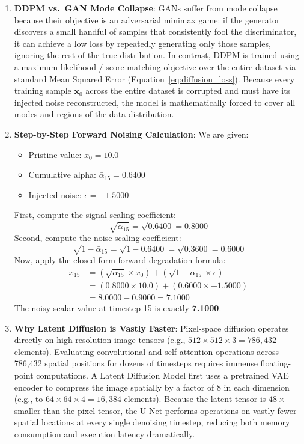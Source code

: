 \begin{enumerate}
    \item \textbf{DDPM vs.\ GAN Mode Collapse}:
    GANs suffer from mode collapse because their objective is an adversarial minimax game: if the generator discovers a small handful of samples that consistently fool the discriminator, it can achieve a low loss by repeatedly generating only those samples, ignoring the rest of the true distribution. In contrast, DDPM is trained using a maximum likelihood / score-matching objective over the entire dataset via standard Mean Squared Error (Equation~\eqref{eq:diffusion_loss}). Because every training sample $\mathbf{x}_0$ across the entire dataset is corrupted and must have its injected noise reconstructed, the model is mathematically forced to cover all modes and regions of the data distribution.

    \item \textbf{Step-by-Step Forward Noising Calculation}:
    We are given:
    \begin{itemize}
        \item Pristine value: $x_0 = 10.0$
        \item Cumulative alpha: $\bar{\alpha}_{15} = 0.6400$
        \item Injected noise: $\epsilon = -1.5000$
    \end{itemize}
    First, compute the signal scaling coefficient:
    \begin{equation*}
    \sqrt{\bar{\alpha}_{15}} = \sqrt{0.6400} = 0.8000
    \end{equation*}
    Second, compute the noise scaling coefficient:
    \begin{equation*}
    \sqrt{1 - \bar{\alpha}_{15}} = \sqrt{1 - 0.6400} = \sqrt{0.3600} = 0.6000
    \end{equation*}
    Now, apply the closed-form forward degradation formula:
    \begin{align*}
    x_{15} &= \left(\sqrt{\bar{\alpha}_{15}} \times x_0\right) + \left(\sqrt{1 - \bar{\alpha}_{15}} \times \epsilon\right)\\
           &= (0.8000 \times 10.0) + (0.6000 \times -1.5000)\\
           &= 8.0000 - 0.9000 = 7.1000
    \end{align*}
    The noisy scalar value at timestep 15 is exactly \textbf{7.1000}.

    \item \textbf{Why Latent Diffusion is Vastly Faster}:
    Pixel-space diffusion operates directly on high-resolution image tensors (e.g., $512 \times 512 \times 3 = 786{,}432$ elements). Evaluating convolutional and self-attention operations across 786,432 spatial positions for dozens of timesteps requires immense floating-point computations. A Latent Diffusion Model first uses a pretrained VAE encoder to compress the image spatially by a factor of 8 in each dimension (e.g., to $64 \times 64 \times 4 = 16{,}384$ elements). Because the latent tensor is $48\times$ smaller than the pixel tensor, the U-Net performs operations on vastly fewer spatial locations at every single denoising timestep, reducing both memory consumption and execution latency dramatically.


\end{enumerate}
